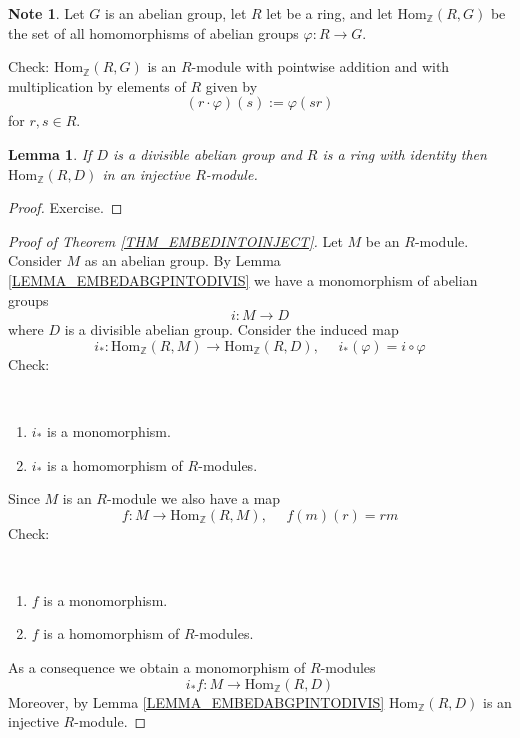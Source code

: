 \documentclass[12pt, letterpaper, oneside]{article}
\theoremstyle{plain}
\newtheorem{lemma}[theorem]{Lemma}
\theoremstyle{definition}
\newtheorem{note}[theorem]{Note}
\newcommand{\lra}{\longrightarrow}
\newcommand{\Z}{{\mathbb Z}}
\newcommand{\Hom}{\mathrm{Hom}}
\newcommand{\benu}{\begin{enumerate}}
\newcommand{\eenu}{\end{enumerate}}
\newcommand{\vs}{\vskip 5mm}
\newcommand{\isep}[1][0]{\setlength{\itemsep}{#1 mm}}
\begin{document}
\begin{note}
Let $G$ is an abelian group, let $R$ let be a ring, and let $\Hom_{\Z}(R, G)$ be the set 
of all homomorphisms of abelian groups $\varphi\colon R \to G$. 

Check: $\Hom_{\Z}(R, G)$ is an $R$-module with pointwise addition and with multiplication 
by elements of $R$ given by 
$$(r\cdot \varphi)(s) := \varphi(sr)$$
for $r,s\in R$.
\end{note}

\vs\vs

\begin{lemma}
\label{LEMMA_HOMTODIVISINJ}
If $D$ is a divisible abelian group and $R$ is a ring with identity then $\Hom_{\Z}(R, D)$ in an 
injective $R$-module. 
\end{lemma}


\begin{proof}
Exercise. 
\end{proof}


\vs\vs

\begin{proof}[Proof of Theorem \ref{THM_EMBEDINTOINJECT}]
Let $M$ be an $R$-module. Consider $M$ as an abelian group. 
By Lemma \ref{LEMMA_EMBEDABGPINTODIVIS} we have a monomorphism 
of abelian groups 
$$i\colon M \lra D$$
where $D$ is a divisible abelian group. 
Consider the induced map 
$$i_{\ast}\colon \Hom_{\Z}(R, M) \to \Hom_{\Z}(R, D), \ \ \ \ \ \ i_{\ast}(\varphi) = i\circ \varphi$$
Check:

\vskip  -13mm

\ 
\benu
\isep[0]
\item $i_{\ast}$ is a monomorphism.
\item $i_{\ast}$ is a homomorphism of $R$-modules. 
\eenu
Since $M$ is an $R$-module we also have a map 
$$f\colon M \to \Hom_{\Z}(R, M), \ \ \ \ \ \ f(m)(r) = rm $$ 
Check:

\vskip  -13mm

\ 
\benu
\isep[0]
\item $f$ is a monomorphism.
\item $f$ is a homomorphism of $R$-modules. 
\eenu

As a consequence we obtain a monomorphism of $R$-modules
$$i_{\ast}f \colon M \lra \Hom_{\Z}(R, D)$$
Moreover, by Lemma \ref{LEMMA_EMBEDABGPINTODIVIS} $\Hom_{\Z}(R, D)$
is an injective $R$-module. 

\end{proof}
\end{document}
